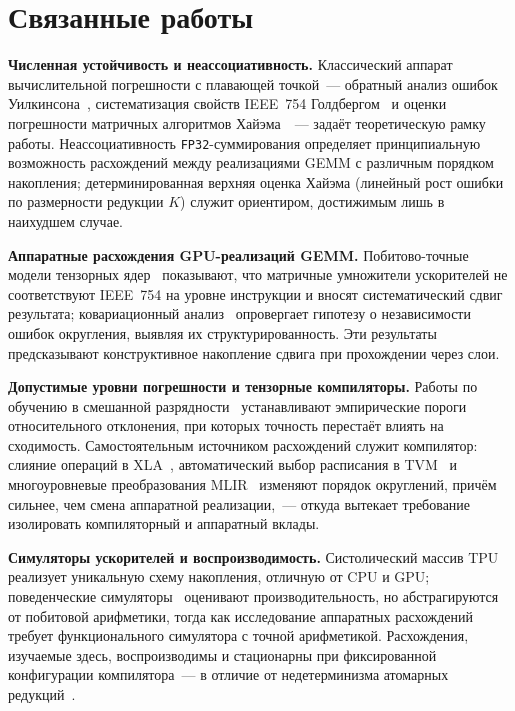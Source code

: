 \section{Связанные работы}
\label{sec:related}

\textbf{Численная устойчивость и неассоциативность.}
Классический аппарат вычислительной погрешности с плавающей точкой~--- обратный
анализ ошибок Уилкинсона~\cite{Wilkinson1963}, систематизация свойств
IEEE~754 Голдбергом~\cite{Goldberg1991} и оценки погрешности матричных
алгоритмов Хайэма~\cite{Higham2002}~--- задаёт теоретическую рамку работы.
Неассоциативность \texttt{FP32}-суммирования определяет принципиальную
возможность расхождений между реализациями GEMM с различным порядком
накопления; детерминированная верхняя оценка Хайэма (линейный рост ошибки по
размерности редукции $K$) служит ориентиром, достижимым лишь в наихудшем случае.

\textbf{Аппаратные расхождения GPU-реализаций GEMM.}
Побитово-точные модели тензорных ядер~\cite{MMASim2025,Khattak2025} показывают,
что матричные умножители ускорителей не соответствуют IEEE~754 на уровне
инструкции и вносят систематический сдвиг результата; ковариационный
анализ~\cite{Yashwanth2025} опровергает гипотезу о независимости ошибок
округления, выявляя их структурированность. Эти результаты предсказывают
конструктивное накопление сдвига при прохождении через слои.

\textbf{Допустимые уровни погрешности и тензорные компиляторы.}
Работы по обучению в смешанной разрядности~\cite{Micikevicius2018,Wang2018FP8}
устанавливают эмпирические пороги относительного отклонения, при которых
точность перестаёт влиять на сходимость. Самостоятельным источником расхождений
служит компилятор: слияние операций в XLA~\cite{Snider2023}, автоматический
выбор расписания в TVM~\cite{Chen2018TVM} и многоуровневые преобразования
MLIR~\cite{Lattner2021MLIR} изменяют порядок округлений, причём сильнее, чем
смена аппаратной реализации,~--- откуда вытекает требование изолировать
компиляторный и аппаратный вклады.

\textbf{Симуляторы ускорителей и воспроизводимость.}
Систолический массив TPU~\cite{Jouppi2017} реализует уникальную схему
накопления, отличную от CPU и GPU; поведенческие
симуляторы~\cite{Samajdar2020,Rashidi2020} оценивают производительность, но
абстрагируются от побитовой арифметики, тогда как исследование аппаратных
расхождений требует функционального симулятора с точной арифметикой.
Расхождения, изучаемые здесь, воспроизводимы и стационарны при фиксированной
конфигурации компилятора~--- в отличие от недетерминизма атомарных
редукций~\cite{Langroudi2024,ZhangDeterministic2025}.

